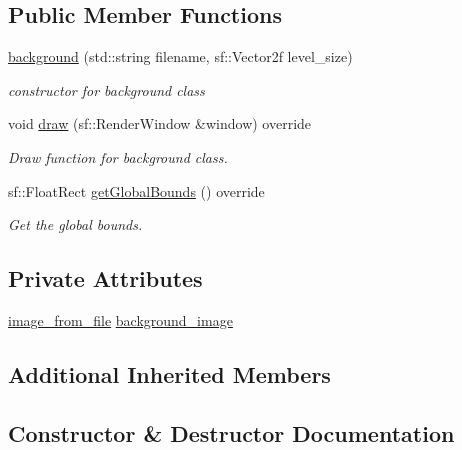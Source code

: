 \subsection*{Public Member Functions}
\begin{DoxyCompactItemize}
\item 
\hyperlink{classbackground_ad199eead2ef4a4d867f2542d3a152471}{background} (std\+::string filename, sf\+::\+Vector2f level\+\_\+size)
\begin{DoxyCompactList}\small\item\em constructor for background class \end{DoxyCompactList}\item 
void \hyperlink{classbackground_a41736f9a00defad1e84b3a8099c887e2}{draw} (sf\+::\+Render\+Window \&window) override
\begin{DoxyCompactList}\small\item\em Draw function for background class. \end{DoxyCompactList}\item 
sf\+::\+Float\+Rect \hyperlink{classbackground_ab5f2b627cd58e0d07678f0af01c6bd2d}{get\+Global\+Bounds} () override
\begin{DoxyCompactList}\small\item\em Get the global bounds. \end{DoxyCompactList}\end{DoxyCompactItemize}
\subsection*{Private Attributes}
\begin{DoxyCompactItemize}
\item 
\hyperlink{classimage__from__file}{image\+\_\+from\+\_\+file} \hyperlink{classbackground_a972ef28e3ac5aea925fc9d00e809d5af}{background\+\_\+image}
\end{DoxyCompactItemize}
\subsection*{Additional Inherited Members}


\subsection{Constructor \& Destructor Documentation}
\mbox{\label{classbackground_ad199eead2ef4a4d867f2542d3a152471}} 
